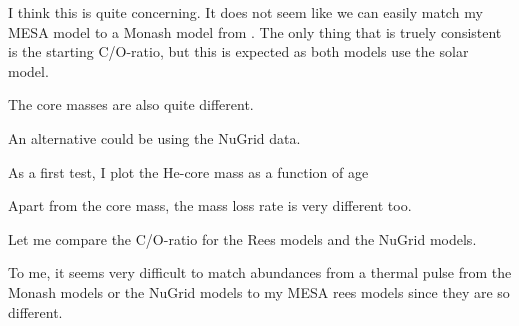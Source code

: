 \documentclass[a4paper,10pt]{article}
\begin{document}
I think this is quite concerning. It does not seem like we can easily match my MESA model to a Monash model from \citet{karakas2016}. The only thing that is truely consistent is the starting C/O-ratio, but this is expected as both models use the \citet{asplund2009} solar model.

The core masses are also quite different.

\begin{figure}[ht]
    \centering
\end{figure}

An alternative could be using the NuGrid data.

As a first test, I plot the He-core mass as a function of age

\begin{figure}[ht]
    \centering
\end{figure}

Apart from the core mass, the mass loss rate is very different too.

\begin{figure}[ht]
    \centering
\end{figure}

Let me compare the C/O-ratio for the Rees models and the NuGrid models.

\begin{figure}[ht]
    \centering
\end{figure}

To me, it seems very difficult to match abundances from a thermal pulse from the Monash models or the NuGrid models to my MESA rees models since they are so different.
\end{document}
